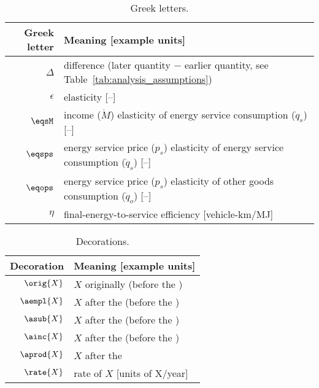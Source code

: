 
\begin{table}
\centering %
\caption{Greek letters.}
\begin{tabular}{r l}
  \toprule
  Greek letter & Meaning [example units] \\
  \midrule
  $\Delta$ & difference (later quantity $-$ earlier quantity, see Table~\ref{tab:analysis_assumptions}) \\
  $\epsilon$ & elasticity [--] \\
  $\eqsM$  & income ($\dot{M}$) elasticity of energy service consumption ($\dot{q}_s$) [--] \\
  $\eqsps$ & energy service price ($p_s$) elasticity of energy service consumption ($\dot{q}_s$) [--] \\
  $\eqops$ & energy service price ($p_s$) elasticity of other goods consumption ($\dot{q}_o$) [--] \\
  $\eta$ & final-energy-to-service efficiency [vehicle-km/MJ] \\
  \bottomrule
\end{tabular}
\label{tab:greek}
\end{table}



\begin{table}
\centering %
\caption{Decorations.}
\begin{tabular}{r l}
  \toprule
  Decoration & Meaning [example units] \\
  \midrule
  $\orig{X}$ & $X$ originally (before the \empleffect{}) \\
  $\aempl{X}$  & $X$ after the \empleffect{} (before the \subeffect{}) \\
  $\asub{X}$ & $X$ after the \subeffect{} (before the \inceffect{}) \\
  $\ainc{X}$ & $X$ after the \inceffect{} (before the \prodeffect{}) \\
  $\aprod{X}$ & $X$ after the \prodeffect{} \\
  $\rate{X}$ & rate of $X$ [units of X/year] \\
  \bottomrule
\end{tabular}
\label{tab:decorations}
\end{table}


